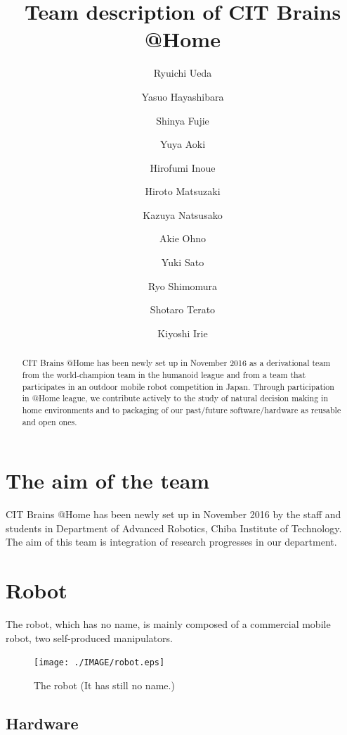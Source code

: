 \documentclass{llncs}
\begin{document}
\title{Team description of CIT Brains @Home}

\author{Ryuichi Ueda \and
Yasuo Hayashibara \and
Shinya Fujie \and
Yuya Aoki \and
Hirofumi Inoue \and
Hiroto Matsuzaki \and
Kazuya Natsusako \and
Akie Ohno \and
Yuki Sato \and
Ryo Shimomura \and
Shotaro Terato \and
Kiyoshi Irie
}


\maketitle
%
\begin{abstract}
CIT Brains @Home has been newly set up in November 2016
as a derivational team from the world-champion team
in the humanoid league and from a team that participates in
an outdoor mobile robot competition in Japan.
Through participation in @Home league,
we contribute actively to the study of natural decision making
in home environments and to packaging of our past/future
software/hardware as reusable and open ones.
\end{abstract}

\section{The aim of the team}

CIT Brains @Home has been newly set up in November 2016
by the staff and students in Department of Advanced Robotics,
Chiba Institute of Technology.
The aim of this team is integration of research progresses
in our department.

\section{Robot}
The robot, which has no name, is mainly composed of a commercial mobile robot,
two self-produced manipulators.

\begin{figure}[h]
	\begin{center}
		\texttt{[image: ./IMAGE/robot.eps]}
		\caption{The robot (It has still no name.)}
		\label{fig:robot}
	\end{center}
\end{figure}

\subsection{Hardware}
\end{document}
